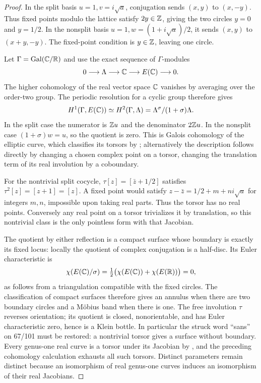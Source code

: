 \begin{proof}
In the split basis $u=1,v=i\sqrt a$, conjugation sends $(x,y)$ to $(x,-y)$. Thus fixed points modulo the lattice satisfy $2y\in{\ensuremath{\mathbb{Z}}}$, giving the two circles $y=0$ and $y=1/2$. In the nonsplit basis $u=1,w=(1+i\sqrt a)/2$, it sends $(x,y)$ to $(x+y,-y)$. The fixed-point condition is $y\in{\ensuremath{\mathbb{Z}}}$, leaving one circle.

Let $\Gamma=\operatorname{Gal}({\mathbb{C}}/{\mathbb{R}})$ and use the exact sequence of $\Gamma$-modules
\[
 0\longrightarrow\Lambda\longrightarrow{\ensuremath{\mathbb{C}}}\longrightarrow E({\mathbb{C}})
 \longrightarrow0.
\]
The higher cohomology of the real vector space ${\mathbb{C}}$ vanishes by averaging over the order-two group. The periodic resolution for a cyclic group therefore gives
\[
 H^1(\Gamma,E({\mathbb{C}}))\simeq H^2(\Gamma,\Lambda)
 =\Lambda^\sigma/(1+\sigma)\Lambda.
\]
In the split case the numerator is ${\mathbb{Z}} u$ and the denominator $2{\mathbb{Z}} u$. In the nonsplit case $(1+\sigma)w=u$, so the quotient is zero. This is Galois cohomology of the elliptic curve, which classifies its torsors by \cite[IV, Theorem 7.8]{MilneEC2021A567}; alternatively the description follows directly by changing a chosen complex point on a torsor, changing the translation term of its real involution by a coboundary.

For the nontrivial split cocycle, $\tau[z]=[\bar{z}+1/2]$ satisfies $\tau^2[z]=[z+1]=[z]$. A fixed point would satisfy $z-\bar{z}=1/2+m+ni\sqrt a$ for integers $m,n$, impossible upon taking real parts. Thus the torsor has no real points. Conversely any real point on a torsor trivializes it by translation, so this nontrivial class is the only pointless form with that Jacobian.

The quotient by either reflection is a compact surface whose boundary is exactly its fixed locus: locally the quotient of complex conjugation is a half-disc. Its Euler characteristic is
\[
 \chi(E({\mathbb{C}})/\sigma)=\tfrac12\bigl(\chi(E({\mathbb{C}}))+\chi(E({\mathbb{R}}))\bigr)=0,
\]
as follows from a triangulation compatible with the fixed circles. The classification of compact surfaces therefore gives an annulus when there are two boundary circles and a M\"obius band when there is one. The free involution $\tau$ reverses orientation; its quotient is closed, nonorientable, and has Euler characteristic zero, hence is a Klein bottle. In particular the struck word ``sans'' on 67/101 must be restored: a nontrivial torsor gives a surface without boundary. Every genus-one real curve is a torsor under its Jacobian by \cite[IV, Theorem 7.19]{MilneEC2021A567}, and the preceding cohomology calculation exhausts all such torsors. Distinct parameters remain distinct because an isomorphism of real genus-one curves induces an isomorphism of their real Jacobians.
\end{proof}

